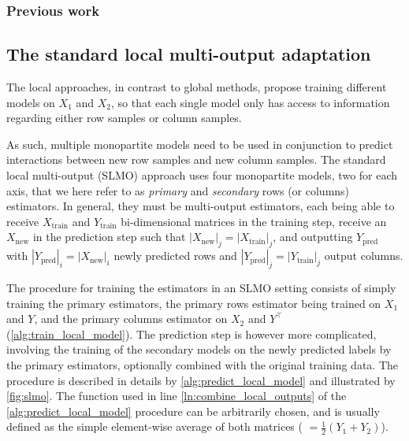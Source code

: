 
\subsubsection{Previous work}
\label{sec:sgso_previous_work}

\subsection{The standard local multi-output adaptation}
\label{sec:slmo}

The local approaches, in contrast to global methods, propose training different models on $X_1$ and $X_2$, so that each single model only has access to information regarding either row samples or column samples.

As such, multiple monopartite models need to be used in conjunction to predict interactions between new row samples and new column samples. The standard local multi-output (SLMO) approach uses four monopartite models, two for each axis, that we here refer to as \emph{primary} and \emph{secondary} rows (or columns) estimators. In general, they must be multi-output estimators, each being able to receive $X_\text{train}$ and $Y_\text{train}$ bi-dimensional matrices in the training step, receive an $X_\text{new}$ in the prediction step such that $|X_\text{new}|_j=|X_\text{train}|_j$, and outputting $Y_\text{pred}$ with $|Y_\text{pred}|_i=|X_\text{new}|_i$ newly predicted rows and $|Y_\text{pred}|_j = |Y_\text{train}|_j$ output columns.

The procedure for training the estimators in an SLMO setting consists of simply training the primary estimators, the primary rows estimator being trained on $X_1$ and $Y$, and the primary columns estimator on $X_2$ and $Y^\intercal$ (\autoref{alg:train_local_model}). The prediction step is however more complicated, involving the training of the secondary models on the newly predicted labels by the primary estimators, optionally combined with the original training data. The procedure is described in details by \autoref{alg:predict_local_model} and illustrated by \autoref{fig:slmo}. The \KwCombine function used in line \autoref{ln:combine_local_outputs} of the \autoref{alg:predict_local_model} procedure can be arbitrarily chosen, and is usually defined as the simple element-wise average of both matrices ( $= \frac{1}{2}(Y_1 + Y_2)$).

\algTrainLocalModel
\algPredictLocalModel


